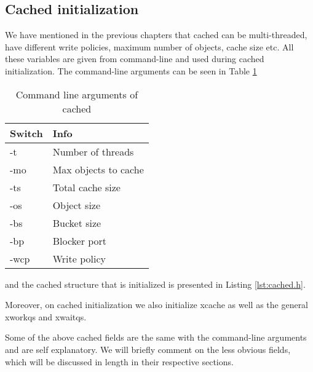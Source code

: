 \subsection{Cached initialization}\label{sec:cached-init-imp}

We have mentioned in the previous chapters that cached can be multi-threaded, 
have different write policies, maximum number of objects, cache size etc. All 
these variables are given from command-line and used during cached 
initialization. The command-line arguments can be seen in Table \ref{tab:usage}

\begin{table}
	\centering
	\begin{tabular}{ | l | l | }
		\hline
		Switch & Info \\ \hline \hline
		-t & Number of threads \\ \hline
		-mo & Max objects to cache \\ \hline
		-ts & Total cache size \\ \hline
		-os & Object size \\ \hline
		-bs & Bucket size \\ \hline
		-bp & Blocker port \\ \hline
		-wcp & Write policy \\ \hline
	\end{tabular}
	\caption{Command line arguments of cached}
	\label{tab:usage}
\end{table}

and the cached structure that is initialized is presented in Listing 
\ref{lst:cached.h}. 


Moreover, on cached initialization we also initialize xcache as well as the 
general xworkqs and xwaitqs.

Some of the above cached fields are the same with the command-line arguments 
and are self explanatory. We will briefly comment on the less obvious fields, 
which will be discussed in length in their respective sections.

